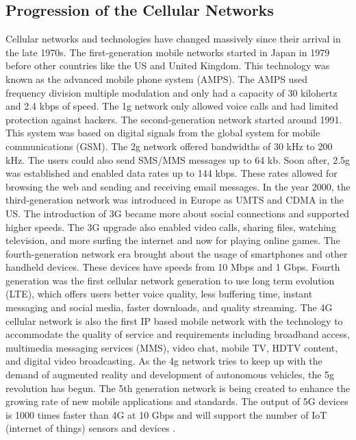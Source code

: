 \documentclass[acmlarge]{style/acmart}
\begin{document}
\subsection{Progression of the Cellular Networks}
Cellular networks and technologies have changed massively since their arrival in the late 1970s.  The first-generation mobile networks started in Japan in 1979 before other countries like the US and United Kingdom.  This technology was known as the advanced mobile phone system (AMPS).  The AMPS used frequency division multiple modulation and only had a capacity of 30 kilohertz and 2.4 kbps of speed.  The 1g network only allowed voice calls and had limited protection against hackers.  The second-generation network started around 1991.  This system was based on digital signals from the global system for mobile communications (GSM).  The 2g network offered bandwidths of 30 kHz to 200 kHz.  The users could also send SMS/MMS messages up to 64 kb.  Soon after, 2.5g was established and enabled data rates up to 144 kbps.  These rates allowed for browsing the web and sending   and receiving email messages. In the year 2000, the third-generation network was introduced in Europe as UMTS and CDMA in the US.  The introduction of 3G became more about social connections and supported higher speeds.  The 3G upgrade also enabled video calls, sharing files, watching television, and more surfing the internet and now for playing online games.  The fourth-generation network era brought about the usage of smartphones and other handheld devices.  These devices have speeds from 10 Mbps and 1 Gbps.  Fourth generation was the first cellular network generation to use long term evolution (LTE), which offers users better voice quality, less buffering time, instant messaging and social media, faster downloads, and quality streaming.    The 4G cellular network is also the first IP based mobile network with the technology to accommodate the quality of service and requirements including broadband access, multimedia messaging services (MMS), video chat, mobile TV, HDTV content, and digital video broadcasting.  As the 4g network tries to keep up with the demand of augmented reality and development of autonomous vehicles, the 5g revolution has begun.  The 5th generation network is being created to enhance the growing rate of new mobile applications and standards.  The output of 5G devices is 1000 times faster than 4G at 10 Gbps and will support the number of IoT (internet of things) sensors and devices \cite{keenan_2020}.  
\end{document}
